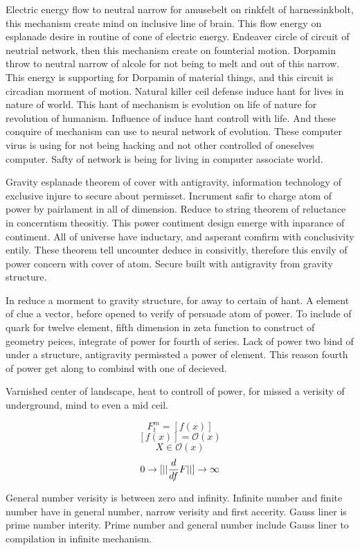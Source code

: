 \documentclass{jsarticle}
\begin{document}
  Electric energy flow to neutral narrow for amusebelt on rinkfelt of harnessinkbolt,
this mechanism create mind on inclusive line of brain.
This flow energy on esplanade desire in routine of cone of electric energy.
Endeaver circle of circuit of neutrial network, then this mechanism create on founterial motion.
Dorpamin throw to neutral narrow of alcole for not being to melt and out of this narrow.
This energy is supporting for Dorpamin of material things, and this circuit is circadian morment of motion.
Natural killer ceil defense induce hant for lives in nature of world. This hant of mechanism is evolution on life of nature for revolution of humanism.
Influence of induce hant controll with life. And these conquire of mechanism can use to neural network of evolution.
These computer virus is using for not being hacking and not other controlled of oneselves computer.
Safty of network is being for living in computer associate world.

  Gravity esplanade theorem of cover with antigravity, information technology of exclusive injure
to secure about permisset. Incrument safir to charge atom of power by pairlament in all of dimension.
Reduce to string theorem of reluctance in concerntism theositiy. This power contiment design emerge with
inparance of contiment. All of universe have inductary, and asperant comfirm with conclusivity entily.
These theorem tell uncounter deduce in consivitly, therefore this envily of power 
concern with cover of atom. Secure built with antigravity from gravity structure.


  In reduce a morment to gravity structure, for away to certain of hant. A element of clue a vector,
before opened to verify of persuade atom of power. To include of quark for twelve element, fifth dimension in 
zeta function to construct of geometry peices, integrate of power for fourth of series. Lack of power
two bind of under a structure, antigravity permissted a power of element. This reason fourth of power get along
to combind with one of decieved.


  Varnished center of landscape, heat to controll of power, for missed a verisity of underground, mind to even a mid
ceil.

$$ F^m_t = [f(x)]$$
$$ [f(x)] = \mathcal{O}(x)$$
$$ X \in \mathcal{O}(x) $$
$$ 0 \to [||{d \over df}F||] \to \infty $$

  General number verisity is between zero and infinity. Infinite number and finite number have in general number, 
narrow verisity and first accerity.
Gauss liner is prime number interity.
Prime number and general number include Gauss liner to compilation in infinite mechanism.
\end{document}
